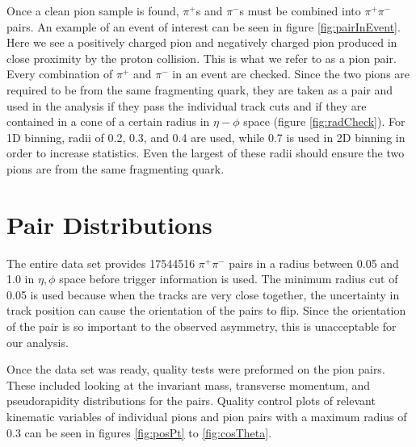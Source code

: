 \documentclass[abstract = on,listof=totoc, bibliography=totoc]{scrreprt}
\begin{document}

Once a clean pion sample is found, $\pi^+$s and $\pi^-$s must be combined into $\pi^+\pi^-$ pairs. An example of an event of interest can be seen in figure \ref{fig:pairInEvent}. Here we see a positively charged pion and negatively charged pion produced in close proximity by the proton collision. This is what we refer to as a pion pair.  Every combination of $\pi^+$ and $\pi^-$ in an event are checked. Since the two pions are required to be from the same fragmenting quark, they are taken as a pair and used in the analysis if they pass the individual track cuts and if they are contained in a cone of a certain radius in $\eta-\phi$ space (figure \ref{fig:radCheck}). For 1D binning, radii of 0.2, 0.3, and 0.4 are used, while 0.7 is used in 2D binning in order to increase statistics. Even the largest of these radii should ensure the two pions are from the same fragmenting quark.  


\FloatBarrier
\section{Pair Distributions}

The entire data set provides 17544516 $\pi^+\pi^-$ pairs in a radius between 0.05 and 1.0 in $\eta,\phi$ space before trigger information is used. The minimum radius cut of 0.05 is used because when the tracks are very close together, the uncertainty in track position can cause the orientation of the pairs to flip. Since the orientation of the pair is so important to the observed asymmetry, this is unacceptable for our analysis. 


Once the data set was ready, quality tests were preformed on the pion pairs. These included looking at the invariant mass, transverse momentum, and pseudorapidity distributions for the pairs. Quality control plots of relevant kinematic variables of individual pions and pion pairs with a maximum radius of 0.3 can be seen in figures \ref{fig:posPt} to \ref{fig:cosTheta}. 
\end{document}
